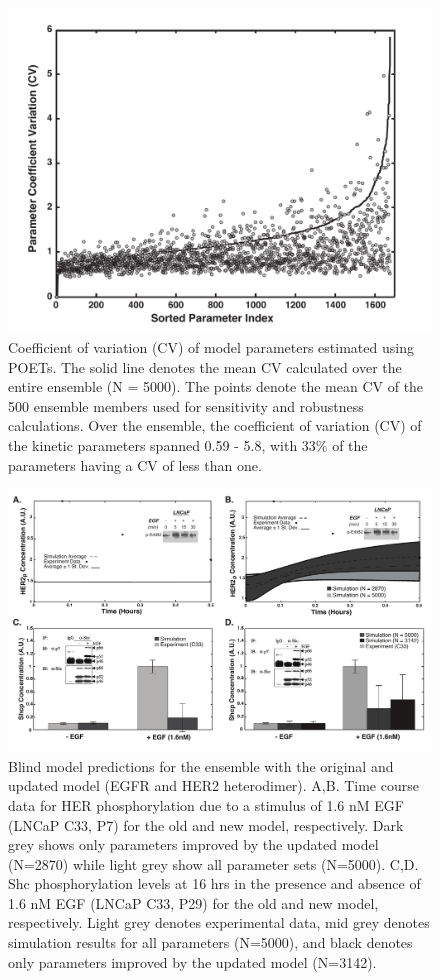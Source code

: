 \documentclass[12pt]{article}
\begin{document}
\begin{figure}\centering
\includegraphics[width=1.0\textwidth]{./figs/Supplementary_CV_Subset_Total}
\caption{Coefficient of variation (CV) of model parameters estimated using POETs. The solid line denotes the mean CV calculated over the entire ensemble (N = 5000). The points denote the mean CV of the 500 ensemble members used for sensitivity and robustness calculations. Over the ensemble, the coefficient of variation (CV) of the kinetic parameters spanned 0.59 - 5.8, with 33\% of the parameters having a CV of less than one.}
\label{fg:Supp_CV}
\end{figure}

\begin{figure}\centering
\includegraphics[width=1.0\textwidth]{./figs/Supp_Figure_NewModelvsOldModel}
\caption{Blind model predictions for the ensemble with the original and updated model (EGFR and HER2 heterodimer). A,B. Time course data for HER phosphorylation due to a stimulus of 1.6 nM EGF (LNCaP C33, P7) for the old and new model, respectively. Dark grey shows only parameters improved by the updated model (N=2870) while light grey show all parameter sets (N=5000). C,D. Shc phosphorylation levels at 16 hrs in the presence and absence of 1.6 nM EGF (LNCaP C33, P29) for the old and new model, respectively. Light grey denotes experimental data, mid grey denotes simulation results for all parameters (N=5000), and black denotes only parameters improved by the updated model (N=3142).}
\label{fg:Exps_NewModelvsOldModel}
\end{figure}
\end{document}
